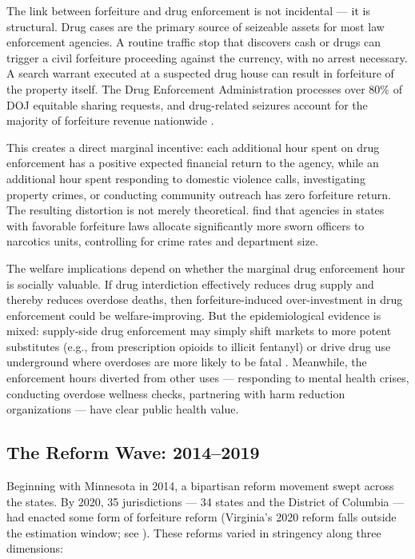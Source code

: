 \documentclass[12pt]{article}
\begin{document}
The link between forfeiture and drug enforcement is not incidental --- it is structural. Drug cases are the primary source of seizeable assets for most law enforcement agencies. A routine traffic stop that discovers cash or drugs can trigger a civil forfeiture proceeding against the currency, with no arrest necessary. A search warrant executed at a suspected drug house can result in forfeiture of the property itself. The Drug Enforcement Administration processes over 80\% of DOJ equitable sharing requests, and drug-related seizures account for the majority of forfeiture revenue nationwide \citep{worrall2011perverse}.

This creates a direct marginal incentive: each additional hour spent on drug enforcement has a positive expected financial return to the agency, while an additional hour spent responding to domestic violence calls, investigating property crimes, or conducting community outreach has zero forfeiture return. The resulting distortion is not merely theoretical. \citet{holcomb2018civil} find that agencies in states with favorable forfeiture laws allocate significantly more sworn officers to narcotics units, controlling for crime rates and department size.

The welfare implications depend on whether the marginal drug enforcement hour is socially valuable. If drug interdiction effectively reduces drug supply and thereby reduces overdose deaths, then forfeiture-induced over-investment in drug enforcement could be welfare-improving. But the epidemiological evidence is mixed: supply-side drug enforcement may simply shift markets to more potent substitutes (e.g., from prescription opioids to illicit fentanyl) or drive drug use underground where overdoses are more likely to be fatal \citep{werb2011effectiveness}. Meanwhile, the enforcement hours diverted from other uses --- responding to mental health crises, conducting overdose wellness checks, partnering with harm reduction organizations --- have clear public health value.

\subsection{The Reform Wave: 2014--2019}

Beginning with Minnesota in 2014, a bipartisan reform movement swept across the states. By 2020, 35 jurisdictions --- 34 states and the District of Columbia --- had enacted some form of forfeiture reform (Virginia's 2020 reform falls outside the estimation window; see ). These reforms varied in stringency along three dimensions:
\end{document}
